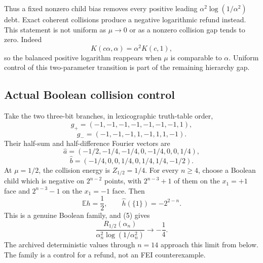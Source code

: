 Thus a fixed nonzero child bias removes every positive leading
\(\alpha^2\log(1/\alpha^2)\) debt.  Exact coherent collisions produce a
negative logarithmic refund instead.  This statement is not uniform as
\(\mu\to0\) or as a nonzero collision gap tends to zero.  Indeed
\[
 K(c\alpha,\alpha)=\alpha^2K(c,1),
\]
so the balanced positive logarithm reappears when \(\mu\) is comparable
to \(\alpha\).  Uniform control of this two-parameter transition is part
of the remaining hierarchy gap.

\subsection*{Actual Boolean collision control}

Take the two three-bit branches, in lexicographic truth-table order,
\[
 g_+=(-1,-1,-1,-1,-1,-1,-1,1),
\]
\[
 g_-=(-1,-1,-1,1,-1,1,1,-1).
\]
Their half-sum and half-difference Fourier vectors are
\[
 \widehat a=(-1/2,-1/4,-1/4,0,-1/4,0,0,1/4),
\]
\[
 \widehat b=(-1/4,0,0,1/4,0,1/4,1/4,-1/2).
\]
At \(\mu=1/2\), the collision energy is \(Z_{1/2}=1/4\).  For every
\(n\ge4\), choose a Boolean child which is negative on \(2^{n-2}\)
points, with \(2^{n-3}+1\) of them on the \(x_1=+1\) face and
\(2^{n-3}-1\) on the \(x_1=-1\) face.  Then
\[
 \mathbb Eh=\frac12,\qquad \widehat h(\{1\})=-2^{2-n}.
\]
This is a genuine Boolean family, and (5) gives
\[
 \frac{R_{1/2}(\alpha_n)}{\alpha_n^2\log(1/\alpha_n^2)}\longrightarrow-\frac14.
\]
The archived deterministic values through \(n=14\) approach this limit
from below.  The family is a control for a refund, not an FEI
counterexample.


